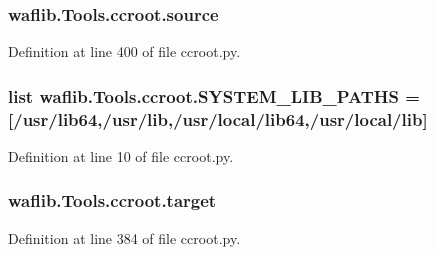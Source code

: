 \subsubsection[{\texorpdfstring{source}{source}}]{\setlength{\rightskip}{0pt plus 5cm}waflib.\+Tools.\+ccroot.\+source}\hypertarget{namespacewaflib_1_1_tools_1_1ccroot_a30ed7b4655b311249958f4434cd919c1}{}\label{namespacewaflib_1_1_tools_1_1ccroot_a30ed7b4655b311249958f4434cd919c1}


Definition at line 400 of file ccroot.\+py.

\subsubsection[{\texorpdfstring{S\+Y\+S\+T\+E\+M\+\_\+\+L\+I\+B\+\_\+\+P\+A\+T\+HS}{SYSTEM_LIB_PATHS}}]{\setlength{\rightskip}{0pt plus 5cm}list waflib.\+Tools.\+ccroot.\+S\+Y\+S\+T\+E\+M\+\_\+\+L\+I\+B\+\_\+\+P\+A\+T\+HS = \mbox{[}\textquotesingle{}/usr/lib64\textquotesingle{},\textquotesingle{}/usr/lib\textquotesingle{},\textquotesingle{}/usr/local/lib64\textquotesingle{},\textquotesingle{}/usr/local/lib\textquotesingle{}\mbox{]}}\hypertarget{namespacewaflib_1_1_tools_1_1ccroot_a80110f39903a6d01ca982662f57ad0a5}{}\label{namespacewaflib_1_1_tools_1_1ccroot_a80110f39903a6d01ca982662f57ad0a5}


Definition at line 10 of file ccroot.\+py.

\subsubsection[{\texorpdfstring{target}{target}}]{\setlength{\rightskip}{0pt plus 5cm}waflib.\+Tools.\+ccroot.\+target}\hypertarget{namespacewaflib_1_1_tools_1_1ccroot_a69ab99c107908aecb0f73e5d3f7c0860}{}\label{namespacewaflib_1_1_tools_1_1ccroot_a69ab99c107908aecb0f73e5d3f7c0860}


Definition at line 384 of file ccroot.\+py.

